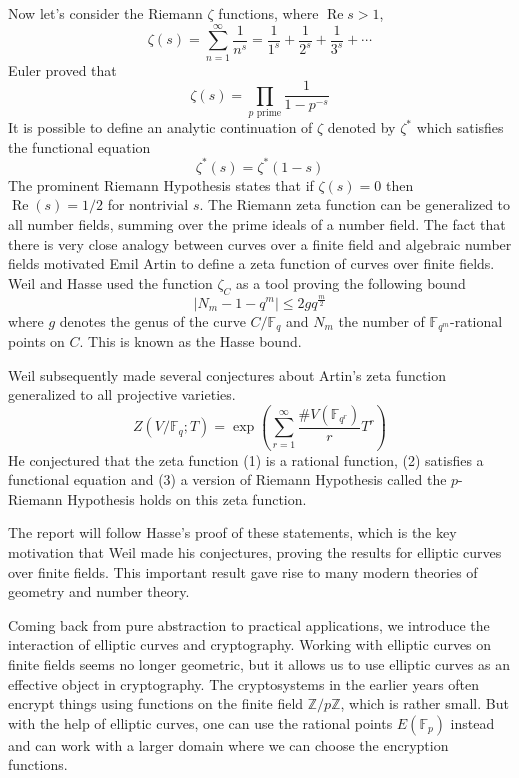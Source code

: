 \documentclass[12pt]{article}
\theoremstyle{remark}
\theoremstyle{definition}
\newcommand{\Z}[0]{\mathbb{Z}}
\newcommand{\F}[0]{\mathbb{F}}
\renewcommand{\Re}[0]{\operatorname{Re}}
\begin{document}
        Now let's consider the Riemann $\zeta$ functions, where $\Re s>1$,
        $$\zeta(s)=\sum_{n=1}^\infty \frac{1}{n^s}=\frac{1}{1^s}+\frac{1}{2^s}+\frac{1}{3^s}+\cdots$$
        Euler proved that 
        $$\zeta (s)=\prod_{p\text{ prime}}\frac{1}{1-p^{-s}}$$
        It is possible to define an analytic continuation of $\zeta$ denoted by $\zeta^*$ which satisfies the functional equation
        $$\zeta^\ast(s)=\zeta^\ast(1-s)$$
        The prominent Riemann Hypothesis states that if $\zeta(s)=0$ then $\Re(s)=1/2$ for nontrivial $s$. The Riemann zeta function can be generalized to all number fields, summing over the prime ideals of a number field. The fact that there is very close analogy between curves over a finite field and algebraic number fields motivated Emil Artin to define a zeta function of curves over finite fields. Weil and Hasse used the function $\zeta_C$ as a tool proving the following bound $$|N_m-1-q^m|\leq2gq^{\frac{m}{2}}$$
        where $g$ denotes the genus of the curve $C/\F_q$ and $N_m$ the number of $\F_{q^m}$-rational points on $C$. This is known as the Hasse bound.
        
        Weil subsequently made several conjectures about Artin's zeta function generalized to all projective varieties.
        \[Z(V/\F_q;T)=\exp\left(\sum_{r=1}^\infty \frac{\# V(\F_{q^r})}{r}T^r\right)\]
        He conjectured that the zeta function (1) is a rational function, (2) satisfies a functional equation and (3) a version of Riemann Hypothesis called the $p$-Riemann Hypothesis holds on this zeta function.
        
        The report will follow Hasse's proof of these statements, which is the key motivation that Weil made his conjectures, proving the results for elliptic curves over finite fields. This important result gave rise to many modern theories of geometry and number theory.

        Coming back from pure abstraction to practical applications, we introduce the interaction of elliptic curves and cryptography. Working with elliptic curves on finite fields seems no longer geometric, but it allows us to use elliptic curves as an effective object in cryptography. The cryptosystems in the earlier years often encrypt things using functions on the finite field $\Z/p\Z$, which is rather small. But with the help of elliptic curves, one can use the rational points $E(\F_p)$ instead and can work with a larger domain where we can choose the encryption functions.
 
 
 
\end{document}
